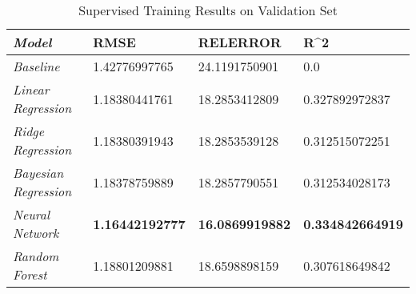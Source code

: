\documentclass[letterpaper, 10 pt, conference]{ieeeconf}  %
\begin{document}

{\renewcommand{\arraystretch}{2}%
\begin{table*}[t]
\centering
\caption{Supervised Training Results on Validation Set}
{}\label{table:validation_set_results}
\begin{tabular}{|l|lll}
\hline
\textit{\textbf{Model}}      & \multicolumn{1}{l|}{\textbf{RMSE}} & \multicolumn{1}{l|}{\textbf{RELERROR}} & \multicolumn{1}{l|}{\textbf{R\textasciicircum 2}} \\ \hline
\textit{Baseline}            & 1.42776997765                      & 24.1191750901                          & 0.0                                               \\ \cline{1-1}
\textit{Linear Regression}   & 1.18380441761                      & 18.2853412809                          & 0.327892972837                                    \\ \cline{1-1}
\textit{Ridge Regression}    & 1.18380391943                      & 18.2853539128                          & 0.312515072251                                    \\ \cline{1-1}
\textit{Bayesian Regression} & 1.18378759889                      & 18.2857790551                          & 0.312534028173                                    \\ \cline{1-1}
\textit{Neural Network}      & \textbf{1.16442192777}             & \textbf{16.0869919882}                 & \textbf{0.334842664919}                           \\ \cline{1-1}
\textit{Random Forest}       & 1.18801209881                      & 18.6598898159                          & 0.307618649842                                    \\ \cline{1-1}
\end{tabular}
\end{table*}
}
\end{document}
